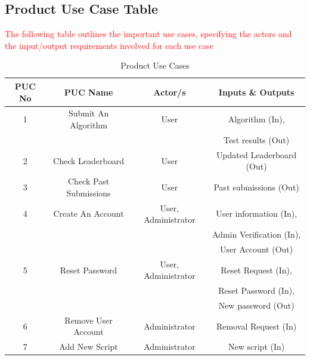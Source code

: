 \documentclass[12pt]{article}
\begin{document}
\subsection{Product Use Case Table}
\textcolor{red}{The following table outlines the important use cases, specifying the actors and the input/output requirements involved for each use case}
\begin{table}[H]
    \centering
    \begin{tabular}{|c|c|c|c|}
         \hline \textbf{PUC No} & \textbf{PUC Name} & \textbf{Actor/s} & \textbf{Inputs \& Outputs}\\
         \hline 1 & Submit An Algorithm & User & Algorithm (In), \\
         & & & Test results (Out)\\
         \hline 2 & Check Leaderboard & User & Updated Leaderboard (Out)\\
         \hline 3 & Check Past Submissions & User & Past submissions (Out)\\
         \hline 4 & Create An Account & User, Administrator & User information (In), \\
         & & & Admin Verification (In), \\
         & & & User Account (Out)\\
         \hline 5 & Reset Password & User, Administrator & Reset Request (In), \\
         & & & Reset Password (In), \\
         & & & New password (Out)\\
         \hline 6 & Remove User Account & Administrator & Removal Request (In)\\
         \hline 7 & Add New Script & Administrator & New script (In)\\
         \hline
    \end{tabular}
    \caption{Product Use Cases}
\end{table}
\end{document}
